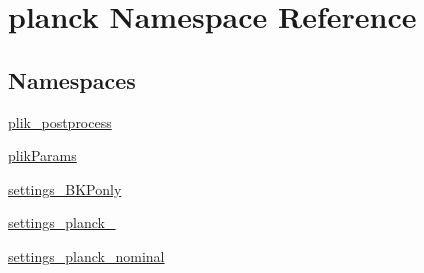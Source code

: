 \hypertarget{namespaceplanck}{}\section{planck Namespace Reference}
\label{namespaceplanck}
\subsection*{Namespaces}
\begin{DoxyCompactItemize}
\item 
 \mbox{\hyperlink{namespaceplanck_1_1plik__postprocess}{plik\+\_\+postprocess}}
\item 
 \mbox{\hyperlink{namespaceplanck_1_1plikParams}{plik\+Params}}
\item 
 \mbox{\hyperlink{namespaceplanck_1_1settings__BKPonly}{settings\+\_\+\+B\+K\+Ponly}}
\item 
 \mbox{\hyperlink{namespaceplanck_1_1settings__planck__2015}{settings\+\_\+planck\+\_}}
\item 
 \mbox{\hyperlink{namespaceplanck_1_1settings__planck__nominal}{settings\+\_\+planck\+\_\+nominal}}
\end{DoxyCompactItemize}
